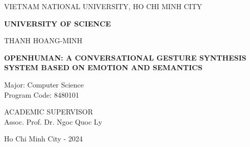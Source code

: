 \begin{titlepage}
	
	\begin{mdframed}[linewidth=1pt, 
		linecolor=black, 
		innerleftmargin=10mm, 
		innerrightmargin=10mm, 
		innertopmargin=10mm, 
		innerbottommargin=10mm]
		
		\centering
		\vspace*{1cm}
		
		{VIETNAM NATIONAL UNIVERSITY, HO CHI MINH CITY\par}
		\vspace{0.25cm}
		\textbf{UNIVERSITY OF SCIENCE}\\
		
		\vspace{2cm}
		
		\large THANH HOANG-MINH \\
		
		\vspace{2cm}
		
		\Large \textbf{\MakeUppercase{OpenHuman: A Conversational Gesture Synthesis System Based on Emotion and Semantics}}\\
		
		\vspace{1cm}
		
		\flushleft
		{\normalsize Major: Computer Science}\\
		{\normalsize Program Code: 8480101}\\
		
		\vspace{2cm}
		
		\centering
		{\normalsize ACADEMIC SUPERVISOR}\\ 
		{\normalsize Assoc. Prof. Dr. Ngoc Quoc Ly}\\
		
		\vfill
		\vspace{3cm}
		
		{\small Ho Chi Minh City - 2024}
	\end{mdframed}
\end{titlepage}

\pagebreak
{}

\pagebreak
